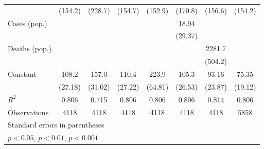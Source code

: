 \documentclass{article}
\begin{document}
{\begin{longtable}{l*{7}{c}}
                &  (154.2)         &  (228.7)         &  (154.7)         &  (152.9)         &  (170.8)         &  (156.6)         &  (154.2)         \\
Cases (pop.)    &                  &                  &                  &                  &    18.94         &                  &                  \\
                &                  &                  &                  &                  &  (29.37)         &                  &                  \\
Deaths (pop.)   &                  &                  &                  &                  &                  &   2281.7\sym{***}&                  \\
                &                  &                  &                  &                  &                  &  (504.2)         &                  \\
Constant        &    108.2\sym{***}&    157.0\sym{***}&    110.4\sym{***}&    223.9\sym{**} &    105.3\sym{***}&    93.16\sym{***}&    75.35\sym{***}\\
                &  (27.18)         &  (31.02)         &  (27.22)         &  (64.81)         &  (26.53)         &  (23.87)         &  (19.12)         \\
\hline
\(R^{2}\)       &    0.806         &    0.715         &    0.806         &    0.806         &    0.806         &    0.814         &    0.806         \\
Observations    &     4118         &     4118         &     4118         &     4118         &     4118         &     4118         &     5858         \\
\hline\hline
\multicolumn{8}{l}{\footnotesize Standard errors in parentheses}\\
\multicolumn{8}{l}{\footnotesize \sym{*} \(p<0.05\), \sym{**} \(p<0.01\), \sym{***} \(p<0.001\)}\\
\end{longtable}
}
\end{document}
